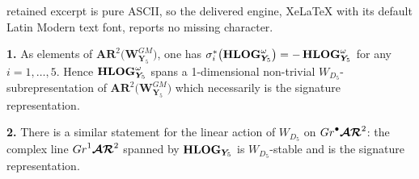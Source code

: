 \documentclass[10pt,a4paper]{amsart}
\newcommand{\sk}{\smallskip}
\begin{document}
retained excerpt is pure ASCII, so the delivered engine, XeLaTeX with its default Latin Modern text font, reports no missing character.
\begin{prop}
\label{Prop:Transformation-sigma-i}
{\bf 1.} As elements of $\boldsymbol{AR}^2\big( \boldsymbol{W}^{GM}_{\boldsymbol{Y}_5} \big)$, one has $\sigma_i^*
\big(  {\bf HLOG}^\omega_{ \boldsymbol{Y}_5}\big)=-  \, {\bf HLOG}^\omega_{ \boldsymbol{Y}_5}$
for any $i=1,\ldots,5$.  Hence 
$ {\bf HLOG}^\omega_{ \boldsymbol{Y}_5}$ spans a 1-dimensional non-trivial $W_{D_5}$-subrepresentation 
of $\boldsymbol{AR}^2\big( \boldsymbol{W}^{GM}_{\boldsymbol{Y}_5} \big)$ 
which necessarily is the signature representation. 
\sk 

\noindent 
{\bf 2.} There is a similar statement for the linear action of $W_{D_5}$ on 
${\rm Gr}^\bullet  \boldsymbol{\mathcal A\mathcal R}^2$: the complex line 
${\rm Gr}^1  \boldsymbol{\mathcal A\mathcal R}^2$ spanned by ${\bf HLOG}_{ \boldsymbol{Y}_5}$ is $W_{D_5}$-stable and is the signature representation. 
\end{prop}
\end{document}
